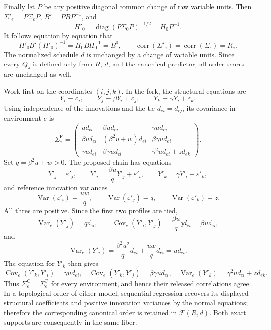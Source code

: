 Finally let \(P\) be any positive diagonal common change of raw variable units.  Then \(\Sigma'_e=P\Sigma_eP\), \(B'=PBP^{-1}\), and
\[
 H'_0=\operatorname{diag}(P\Sigma_0P)^{-1/2}=H_0P^{-1}.
\]
It follows equation by equation that
\[
 H'_0B'(H'_0)^{-1}=H_0BH_0^{-1}=B^0,
 \qquad
 \operatorname{corr}(\Sigma'_e)=\operatorname{corr}(\Sigma_e)=R_e.
\]
The normalized schedule \(d\) is unchanged by a change of variable units.  Since every \(Q_\pi\) is defined only from \(R\), \(d\), and the canonical predictor, all order scores are unchanged as well.

Work first on the coordinates \((i,j,k)\).  In the fork, the structural equations are
\[
 Y_i=\varepsilon_i,\qquad Y_j=\beta Y_i+\varepsilon_j,
 \qquad Y_k=\gamma Y_i+\varepsilon_k.
\]
Using independence of the innovations and the tie \(d_{ei}=d_{ej}\), its covariance in environment \(e\) is
\[
 \Sigma_e^{\mathrm F}=
 \begin{pmatrix}
 ud_{ei}&\beta ud_{ei}&\gamma ud_{ei}\\
 \beta ud_{ei}&(\beta^2u+w)d_{ei}&\beta\gamma ud_{ei}\\
 \gamma ud_{ei}&\beta\gamma ud_{ei}&\gamma^2ud_{ei}+zd_{ek}
 \end{pmatrix}.
\]
Set \(q=\beta^2u+w>0\).  The proposed chain has equations
\[
 Y'_j=\varepsilon'_j,\qquad
 Y'_i=\frac{\beta u}{q}Y'_j+\varepsilon'_i,
 \qquad Y'_k=\gamma Y'_i+\varepsilon'_k,
\]
and reference innovation variances
\[
 \operatorname{Var}(\varepsilon'_i)=\frac{uw}{q},\qquad
 \operatorname{Var}(\varepsilon'_j)=q,\qquad
 \operatorname{Var}(\varepsilon'_k)=z.
\]
All three are positive.  Since the first two profiles are tied,
\[
 \operatorname{Var}_e(Y'_j)=qd_{ei},
 \qquad
 \operatorname{Cov}_e(Y'_i,Y'_j)=\frac{\beta u}{q}qd_{ei}=\beta ud_{ei},
\]
and
\[
 \operatorname{Var}_e(Y'_i)
 =\frac{\beta^2u^2}{q}d_{ei}+\frac{uw}{q}d_{ei}
 =ud_{ei}.
\]
The equation for \(Y'_k\) then gives
\[
 \operatorname{Cov}_e(Y'_k,Y'_i)=\gamma ud_{ei},\quad
 \operatorname{Cov}_e(Y'_k,Y'_j)=\beta\gamma ud_{ei},\quad
 \operatorname{Var}_e(Y'_k)=\gamma^2ud_{ei}+zd_{ek}.
\]
Thus \(\Sigma_e^{\mathrm C}=\Sigma_e^{\mathrm F}\) for every environment, and hence their released correlations agree.  In a topological order of either model, sequential regression recovers its displayed structural coefficients and positive innovation variances by the normal equations; therefore the corresponding canonical order is retained in \(\mathcal F(R,d)\).  Both exact supports are consequently in the same fiber.

